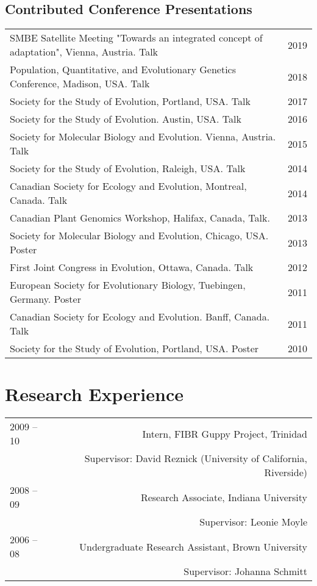 \documentclass[letterpaper]{article}
\begin{document}
\subsection*{Contributed Conference Presentations}
\begin{tabular}{MN}
SMBE Satellite Meeting "Towards an integrated concept of adaptation", Vienna, Austria. Talk & 2019 \\
Population, Quantitative, and Evolutionary Genetics Conference, Madison, USA. Talk & 2018 \\
Society for the Study of Evolution, Portland, USA. Talk & 2017 \\
Society for the Study of Evolution. Austin, USA. Talk  & 2016\\
Society for Molecular Biology and Evolution. Vienna, Austria. Talk & 2015\\ 
Society for the Study of Evolution, Raleigh, USA. Talk & 2014 \\
Canadian Society for Ecology and Evolution, Montreal, Canada. Talk & 2014\\
Canadian Plant Genomics Workshop, Halifax, Canada, Talk. & 2013\\
Society for Molecular Biology and Evolution, Chicago, USA. Poster & 2013\\
First Joint Congress in Evolution, Ottawa, Canada. Talk & 2012\\
European Society for Evolutionary Biology, Tuebingen, Germany. Poster & 2011\\
Canadian Society for Ecology and Evolution. Banff, Canada. Talk & 2011 \\
Society for the Study of Evolution, Portland, USA. Poster & 2010\\
\end{tabular}

\section*{Research Experience}
\begin{tabular}{LR}
2009 -- 10 & Intern, FIBR Guppy Project, Trinidad \\
&Supervisor: David Reznick (University of California, Riverside)\\ [0.5ex]
2008 -- 09 & Research Associate, Indiana University \\
& Supervisor: Leonie Moyle \\ [0.5ex]
2006 -- 08 & Undergraduate Research Assistant, Brown University \\
& Supervisor: Johanna Schmitt
\end{tabular}
\end{document}
